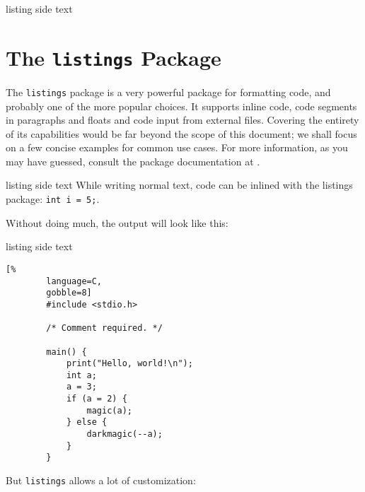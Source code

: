 \documentclass[article,a4paper,oneside,10pt]{memoir}
\newcommand\code[1]{\texttt{#1}}
\begin{document}
\begin{tcblisting}{listing side text}
    \listoflistings
\end{tcblisting}


\newpage
\chapter{The \code{listings}      Package \cite{listings}}
\label{chap:listings}

The \code{listings}  package is a  very powerful package for  formatting code,
and probably one of the  more popular choices\footnotemark. It supports inline
code, code  segments in  paragraphs and  floats and  code input  from external
files. Covering the entirety of its capabilities would be far beyond the scope
of this  document; we  shall focus on  a few concise  examples for  common use
cases.  For  more information, as  you may  have guessed, consult  the package
documentation at \cite{listings}.



\begin{tcblisting}{listing side text}
\lstset{language=C}
While writing normal text, code
can be inlined with the listings
package: \lstinline!int i = 5;!.
\end{tcblisting}


Without doing much, the output will look like this:
\begin{tcblisting}{listing side text}
    \begin{lstlisting}[%
        language=C,
        gobble=8]
        #include <stdio.h>

        /* Comment required. */

        main() {
            print("Hello, world!\n");
            int a;
            a = 3;
            if (a = 2) {
                magic(a);
            } else {
                darkmagic(--a);
            }
        }
    \end{lstlisting}
\end{tcblisting}

\newpage
But \code{listings} allows a lot of customization:
\end{document}
